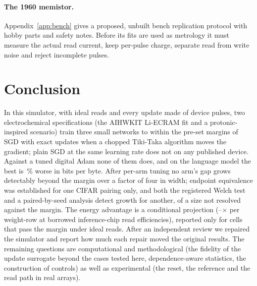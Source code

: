 \paragraph{The 1960 memistor.} Appendix~\ref{app:bench} gives a proposed, unbuilt bench replication protocol with hobby parts and
safety notes. Before its fits are used as metrology it must measure the actual read current, keep per-pulse charge, separate
read from write noise and reject incomplete pulses.

\section{Conclusion}
In this simulator, with ideal reads and every update made of device pulses, two electrochemical specifications (the AIHWKIT
Li-ECRAM fit and a protonic-inspired scenario) train three small networks to within the pre-set margins of SGD with exact updates
when a chopped Tiki-Taka algorithm moves the gradient; plain SGD at the same learning rate does not on any published device. Against
a tuned digital Adam none of them does, and on the language model the best is \RVLmAdamBestGap\,\% worse in bits per byte. After
per-arm tuning no arm's gap grows detectably beyond the margin over a factor of four in width; endpoint equivalence was established
for one CIFAR pairing only, and both the registered Welch test and a paired-by-seed analysis detect growth for another, of a size
not resolved against the margin. The energy advantage is a
conditional projection (\RVenSysMin--\RVenChipMax$\times$ per weight-row at borrowed inference-chip read efficiencies), reported
only for cells that pass the margin under ideal reads. After an independent review we repaired the simulator and report how much each repair moved the
original results. The remaining questions are computational and methodological (the fidelity of the update surrogate beyond the cases tested
here, dependence-aware statistics, the construction of controls) as well as experimental (the reset, the reference and the read
path in real arrays).
